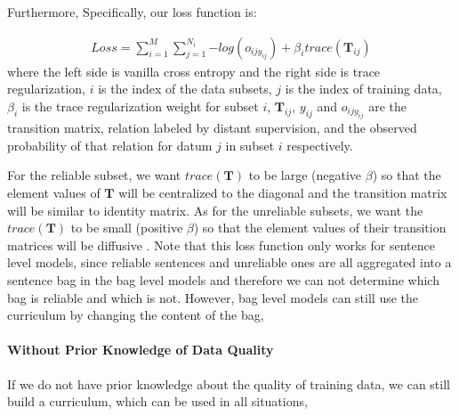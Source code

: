 Furthermore, 
Specifically, our loss function is:

\begin{equation}
\begin{aligned}
Loss=\sum_{i=1}^M{\sum_{j=1}^{N_i}{-log(o_{ijy_{ij}})}} + \beta_i trace(\mathbf{T}_{ij})
\end{aligned}
\end{equation}
where the left side is vanilla cross entropy and the right side is trace regularization, $i$ is the index of the data subsets, $j$ is the index of training data, $\beta_i$ is the trace regularization weight for subset $i$, $\mathbf{T}_{ij}$, $y_{ij}$ and $o_{ijy_{ij}}$ are the transition matrix, relation labeled by distant supervision, and the observed probability of that relation for datum $j$ in subset $i$ respectively.

For the reliable subset, we want $trace(\mathbf{T})$ to be large (negative $\beta$) so that the element values of $\mathbf{T}$ will be centralized to the diagonal and the transition matrix will be similar to identity matrix. As for the unreliable subsets, we want the $trace(\mathbf{T})$ to be small (positive $\beta$) so that the element values of their transition matrices will be diffusive . Note that this loss function only works for sentence level models, since reliable sentences and unreliable ones are all aggregated into a sentence bag in the bag level models and therefore we can not determine which bag is reliable and which is not. However, bag level models can still use the curriculum by changing the content of the bag, 

\paragraph{Without Prior Knowledge of Data Quality}
\label{curr_over_data}
If we do not have prior knowledge about the quality of training data, we can still build a curriculum, which can be used in all situations, 

